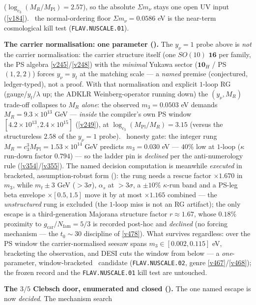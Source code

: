 \documentclass[11pt,a4paper]{article}
\newcommand{\Mpl}{M_{\mathrm{Pl}}}
\newcommand{\gcar}{g_{\mathrm{car}}}
\newcommand{\Nfam}{N_{\mathrm{fam}}}
\theoremstyle{definition}
\begin{document}
($\log_{c_3}(M_R/\Mpl)=2.57$), so the absolute $\Sigma m_\nu$ stays one open UV input (\vref{v184}). \mX\ the
normal-ordering floor $\Sigma m_\nu=0.0586$ eV is the near-term cosmological kill test (\texttt{FLAV.NUSCALE.01}).
\par\smallskip\noindent\textbf{The carrier normalisation: one parameter
().} The $y_\nu{=}1$ probe above is \emph{not} the carrier normalisation:
the carrier structure itself (one $SO(10)$ $\mathbf{16}$ per family, the PS algebra \vref{v245}/\vref{v248})
with the \emph{minimal} Yukawa sector ($\mathbf{10}_H$ / PS $(1,2,2)$) forces $y_\nu=y_t$ at the matching scale
--- a \emph{named} premise (conjectured, ledger-typed), not a proof. With that normalisation and explicit $1$-loop RG
(gauge/$y_t$/$\lambda$ up; the ADKLR Weinberg-operator running down) the $(y_\nu,M_R)$ trade-off collapses to
$M_R$ \emph{alone}: the observed $m_3{=}0.0503$ eV demands $M_R=9.3{\times}10^{13}$ GeV --- \emph{inside} the
compiler's own PS window $[4.2{\times}10^{13},2.4{\times}10^{15}]$ (\vref{v249}), at
$\log_{c_3}(\Mpl/M_R)=3.15$ (versus the structureless $2.58$ of the $y_\nu{=}1$ probe). \mX\ honesty gate: the
integer rung $M_R=c_3^3\Mpl=1.53{\times}10^{14}$ GeV predicts $m_3=0.030$ eV --- $40\%$ low at $1$-loop
($\kappa$ run-down factor $0.794$) --- so the ladder pin is \emph{declined} per the anti-numerology rule
(\vref{v354}/\vref{v355}). The named decision computation is meanwhile \emph{executed} in bracketed,
assumption-robust form (): the rung needs a rescue factor
$\times1.670$ in $m_3$, while $m_t\pm3$ GeV ($>3\sigma$), $\alpha_s$ at $>3\sigma$, a $\pm10\%$
$\kappa$-run band and a PS-leg beta envelope $\times[0.5,1.5]$ move it by at most $\times1.165$
combined --- the \emph{unstructured} rung is excluded (the $1$-loop miss is not an RG artifact); the
only escape is a third-generation Majorana structure factor $r\approx1.67$, whose $0.18\%$ proximity to
$\gcar/\Nfam=5/3$ is recorded post-hoc and \emph{declined} (no forcing mechanism --- the $t_0{\sim}30$
discipline of \vref{v478}). What survives regardless: over the PS window the carrier-normalised seesaw spans
$m_3\in[0.002,0.115]$ eV, bracketing the observation, and DESI cuts the window from below --- a
\emph{one}-parameter, window-bracketed \mO\ candidate (\texttt{FLAV.NUSCALE.02}, genre
\vref{v467}/\vref{v468}); the frozen record and the \texttt{FLAV.NUSCALE.01} kill test are untouched.
\par\smallskip\noindent\textbf{The $3/5$ Clebsch door, enumerated and closed
().} The one named escape is now \emph{decided}. The mechanism search
\end{document}
